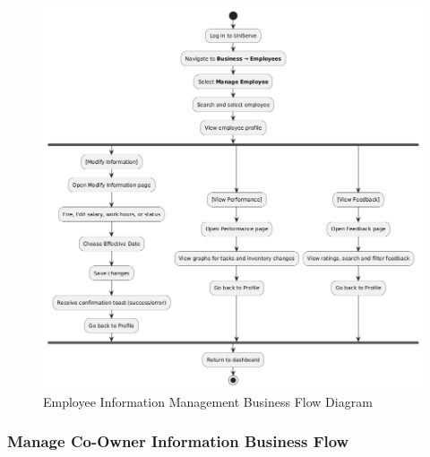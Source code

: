 \documentclass[]{VUMIFTemplateClass}
\begin{document}
\begin{figure}[H]
    \centering
    \includegraphics[width=1\textwidth]{docs/ps-design/design-document/images/diagrams/business/bpmn_manage_employee.png}
    \caption{Employee Information Management Business Flow Diagram}
    \label{fig:user_manage_flow}
\end{figure}

\subsubsection{Manage Co-Owner Information Business Flow}
\end{document}
